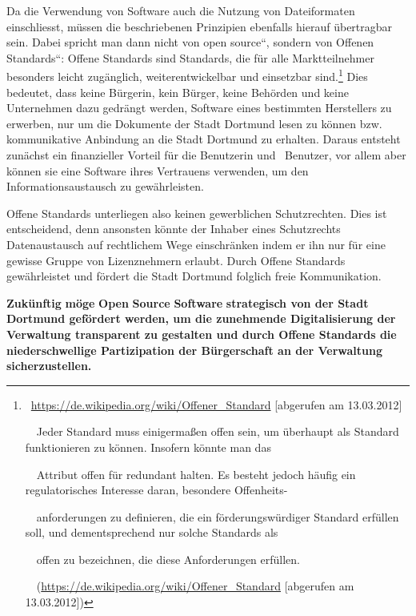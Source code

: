 \documentclass[a4paper]{article}
\begin{document}
\bigskip

{
Da die Verwendung von Software auch die Nutzung von Dateiformaten
einschliesst, m\"ussen die beschriebenen Prinzipien ebenfalls hierauf
\"ubertragbar sein. Dabei spricht man dann nicht von
{\quotedblbase}open source{\textquotedblleft}, sondern von
{\quotedblbase}Offenen Standards{\textquotedblleft}:
{\guillemotright}Offene Standards sind Standards, die f\"ur alle
Marktteilnehmer besonders leicht zug\"anglich, weiterentwickelbar und
einsetzbar
sind.{\guillemotleft}\footnote{\ \url{https://de.wikipedia.org/wiki/Offener_Standard}
[abgerufen am 13.03.2012]\par \ \ {\guillemotright}Jeder Standard muss
einigerma{\ss}en offen sein, um \"uberhaupt als Standard funktionieren
zu k\"onnen. Insofern k\"onnte man das\par \ \ Attribut offen f\"ur
redundant halten. Es besteht jedoch h\"aufig ein regulatorisches
Interesse daran, besondere Offenheits-\par \ \ anforderungen zu
definieren, die ein f\"orderungsw\"urdiger Standard erf\"ullen soll,
und dementsprechend nur solche Standards als\par \ \ offen zu
bezeichnen, die diese Anforderungen erf\"ullen.{\guillemotleft}\par
\ \ (\url{https://de.wikipedia.org/wiki/Offener_Standard} [abgerufen am
13.03.2012])} Dies bedeutet, dass keine B\"urgerin, kein B\"urger,
keine Beh\"orden und keine Unternehmen dazu gedr\"angt werden, Software
eines bestimmten Herstellers zu erwerben, nur um die Dokumente der
Stadt Dortmund lesen zu k\"onnen bzw. kommunikative Anbindung an die
Stadt Dortmund zu erhalten. Daraus entsteht zun\"achst ein finanzieller
Vorteil f\"ur die Benutzerin und \ Benutzer, vor allem aber k\"onnen
sie eine Software ihres Vertrauens verwenden, um den
Informationsaustausch zu gew\"ahrleisten.}

{
Offene Standards unterliegen also keinen gewerblichen Schutzrechten.
Dies ist entscheidend, denn ansonsten k\"onnte der Inhaber eines
Schutzrechts Datenaustausch auf rechtlichem Wege einschr\"anken indem
er ihn nur f\"ur eine gewisse Gruppe von Lizenznehmern erlaubt. Durch
Offene Standards gew\"ahrleistet und f\"ordert die Stadt Dortmund
folglich freie Kommunikation.}


\bigskip

{
\textbf{Zuk\"unftig}\textbf{ }\textbf{m\"oge}\textbf{
}\textbf{Open}\textbf{ }\textbf{Source}\textbf{
}\textbf{Software}\textbf{ strategisch von der Stadt Dortmund
gef\"ordert werden, um die zunehmende Digitalisierung der Verwaltung
transparent zu gestalten und durch Offene Standards die
niederschwellige Partizipation der B\"urgerschaft an der Verwaltung
sicherzustellen.}}
\end{document}
